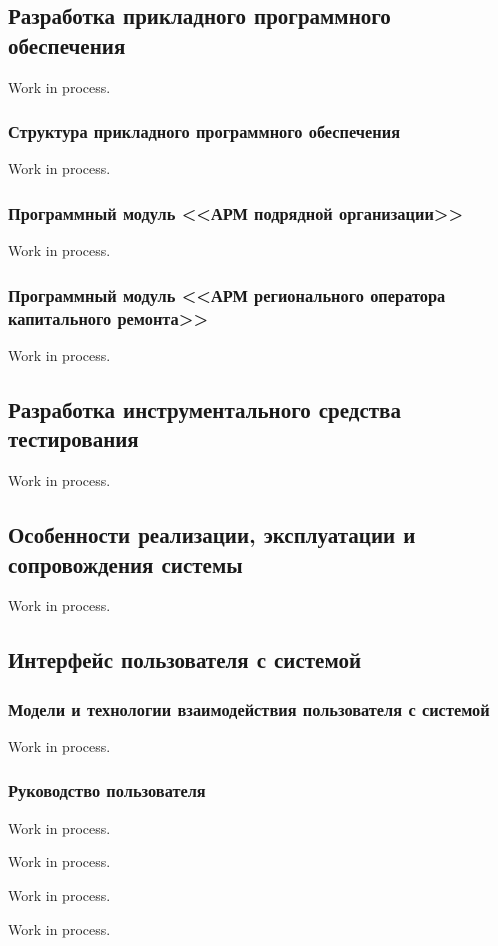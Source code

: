 \subsection{Разработка прикладного программного обеспечения}

Work in process.

\subsubsection{Структура прикладного программного обеспечения}

Work in process.

\subsubsection{Программный модуль <<АРМ подрядной организации>>}

Work in process.

\subsubsection{Программный модуль <<АРМ регионального оператора капитального ремонта>>}

Work in process.

\subsection{Разработка инструментального средства тестирования}

Work in process.

\subsection{Особенности реализации, эксплуатации и сопровождения системы}

Work in process.

\subsection{Интерфейс пользователя с системой}

\subsubsection{Модели и технологии взаимодействия пользователя с системой}

Work in process.

\subsubsection{Руководство пользователя}


Work in process.


Work in process.


Work in process.


Work in process.

\clearpage
\newpage